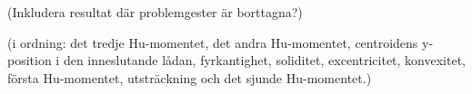 \documentclass[../rapport_MVEX01-11-05]{subfiles}
\begin{document}
(Inkludera resultat där problemgester är borttagna?)

(i ordning: det tredje Hu-momentet, det andra Hu-momentet, centroidens
y-position i den inneslutande lådan, fyrkantighet, soliditet, excentricitet,
konvexitet, första Hu-momentet, utsträckning och det sjunde Hu-momentet.) 

\end{document}
